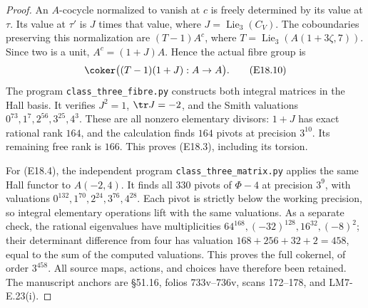 \begin{proof}
An $A$-cocycle normalized to vanish at $c$ is
freely determined by its value at $\tau$.
Its value at $\tau'$ is $J$ times that value,
where $J=\operatorname{Lie}_3(C_V)$.
The coboundaries preserving this normalization
are $(T-1)A^c$, where
$T=\operatorname{Lie}_3(A(1+3\zeta,7))$.
Since two is a unit, $A^c=(1+J)A$. Hence the
actual fibre group is
\[
 \coker\bigl((T-1)(1+J):A\to A\bigr).
 \tag{E18.10}
\]
The program \texttt{class\_three\_fibre.py}
constructs both integral matrices in the Hall
basis. It verifies $J^2=1$, $\tr J=-2$, and
the Smith valuations
$0^{73},1^7,2^{56},3^{25},4^3$.
These are all nonzero elementary divisors:
$1+J$ has exact rational rank $164$, and the
calculation finds $164$ pivots at precision
$3^{10}$. Its remaining free rank is $166$.
This proves (E18.3), including its torsion.

For (E18.4), the independent program
\texttt{class\_three\_matrix.py} applies the
same Hall functor to $A(-2,4)$. It finds all
$330$ pivots of $\Phi-4$ at precision $3^9$,
with valuations
$0^{132},1^{70},2^{24},3^{76},4^{28}$.
Each pivot is strictly below the working
precision, so integral elementary operations
lift with the same valuations. As a separate
check, the rational eigenvalues have
multiplicities
$64^{168},(-32)^{128},16^{32},(-8)^2$;
their determinant difference from four has
valuation $168+256+32+2=458$, equal to the
sum of the computed valuations. This proves
the full cokernel, of order $3^{458}$.
All source maps, actions, and choices have
therefore been retained. The manuscript
anchors are \S51.16, folios 733v--736v,
scans 172--178, and LM7-E.23(i).
\end{proof}


